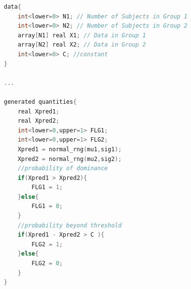 \begin{lstlisting}[language=C++,label={stan::20_02},caption={優越率や閾上率を計算するコード}]
data{
    int<lower=0> N1; // Number of Subjects in Group 1
    int<lower=0> N2; // Number of Subjects in Group 2
    array[N1] real X1; // Data in Group 1
    array[N2] real X2; // Data in Group 2
    int<lower=0> C; //constant 
}

...

generated quantities{
    real Xpred1;
    real Xpred2;
    int<lower=0,upper=1> FLG1;
    int<lower=0,upper=1> FLG2;
    Xpred1 = normal_rng(mu1,sig1);
    Xpred2 = normal_rng(mu2,sig2);
    //probability of dominance
    if(Xpred1 > Xpred2){
        FLG1 = 1;
    }else{
        FLG1 = 0;
    }
    //probability beyond threshold
    if(Xpred1 - Xpred2 > C ){
        FLG2 = 1;
    }else{
        FLG2 = 0;
    }
}
\end{lstlisting}

